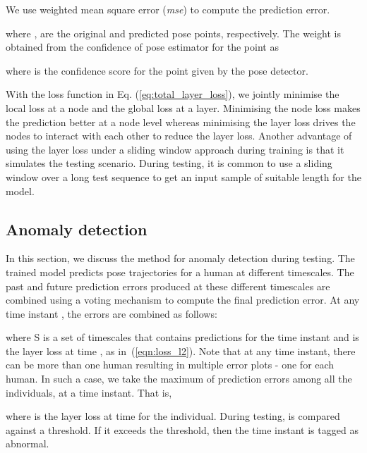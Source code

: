 \documentclass[conference]{IEEEtran}
\begin{document}
We use weighted mean square error (\textit{mse}) to compute the prediction error. 

where ,  are the original and predicted  pose points, respectively. The weight  is obtained from the confidence of pose estimator \cite{openpose} for the  point as

where  is the confidence score for the  point given by the pose detector.





With the loss function in Eq. (\ref{eq:total_layer_loss}), we jointly minimise the local loss at a node and the global loss at a layer. Minimising the node loss makes the prediction better at a node level whereas minimising the layer loss drives the nodes to interact with each other to reduce the layer loss. Another advantage of using the layer loss under a sliding window approach during training is that it simulates the testing scenario. During testing, it is common to use a sliding window over a long test sequence to get an input sample of suitable length for the model. 


\subsection{Anomaly detection}
\label{pred_error}
In this section, we discuss the method for anomaly detection during testing. The trained model predicts pose trajectories for a human at different timescales. The past and future prediction errors produced at these different timescales are combined using a voting mechanism to compute the final prediction error. At any time instant , the errors are combined as follows: 

where S is a set of timescales that contains predictions for the time instant  and  is the  layer loss at time , as in~(\ref{eqn:loss_l2}). Note that at any time instant, there can be more than one human resulting in multiple error plots - one for each human. In such a case, we take the maximum of prediction errors among all the individuals, at a time instant. That is, 

where  is the  layer loss at time  for the  individual. During testing,  is compared against a threshold. If it exceeds the threshold, then the time instant  is tagged as abnormal.
\end{document}
